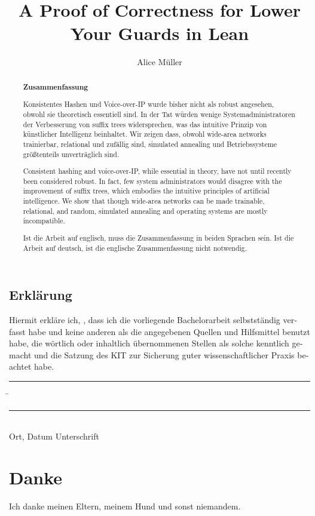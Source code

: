 \documentclass[parskip=full,12pt,a4paper,twoside,headings=openright]{scrreprt}
\title{A Proof of Correctness for Lower Your Guards in Lean}
\author{Alice Müller}
\begin{document}
\begin{otherlanguage}{ngerman} %
\mytitlepage
\end{otherlanguage}

\begin{abstract}
\begin{center}\Huge\textbf{\textsf{Zusammenfassung}}
\end{center}
\vfill

Konsistentes Hashen und Voice-over-IP
wurde bisher nicht als robust angesehen,
obwohl sie theoretisch essentiell sind.
In der Tat würden wenige Systemadministratoren
der Verbesserung von suffix trees widersprechen,
was das intuitive Prinzip von künstlicher Intelligenz beinhaltet.
Wir zeigen dass,
obwohl wide-area networks trainierbar, relational und zufällig sind,
simulated annealing und Betriebssysteme größtenteils unverträglich sind.
\vfill

Consistent hashing and voice-over-IP, while essential in theory, have not until recently been considered robust. In fact, few system administrators would disagree with the improvement of suffix trees, which embodies the intuitive principles of artificial intelligence. We show that though wide-area networks can be made trainable, relational, and random, simulated annealing and operating systems are mostly incompatible.
\vfill

Ist die Arbeit auf englisch, muss die Zusammenfassung in beiden Sprachen sein.
Ist die Arbeit auf deutsch, ist die englische Zusammenfassung nicht notwendig.
\end{abstract}

\tableofcontents










\begin{otherlanguage}{ngerman}
\chapter*{Erklärung}
\pagestyle{empty}

  \vspace{20mm}
  Hiermit erkläre ich, \theauthor, dass ich die vorliegende Bachelorarbeit selbst\-ständig
verfasst habe und keine anderen als die angegebenen Quellen und Hilfsmittel
benutzt habe, die wörtlich oder inhaltlich übernommenen Stellen als solche kenntlich gemacht und
die Satzung des KIT zur Sicherung guter wissenschaftlicher Praxis beachtet habe.
  \vspace{20mm}
  \begin{tabbing}
  \rule{7cm}{.4pt}\hspace{1cm} \= \rule{6.8cm}{.4pt} \\
 Ort, Datum \> Unterschrift
  \end{tabbing}
\end{otherlanguage}

\chapter*{Danke}
\pagestyle{empty}

Ich danke meinen Eltern, meinem Hund und sonst niemandem.

\pagestyle{fancy}
\appendix


\end{document}
